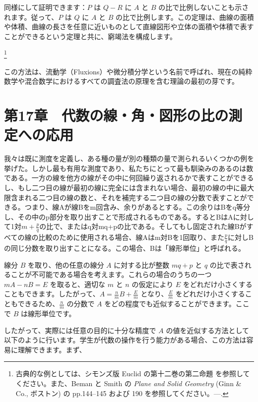\documentclass[a4paper,11pt,openany]{ltjsbook}
\newcommand{\PgSep}[1]{}
\newcommand{\Ed}{\text{Ed}}
\newcommand{\Title}[1]{\textit{#1}}
\begin{document}
同様にして証明できます：\( P \) は \( Q - R \) に \( A \) と \( B \) の比で比例しないことも示されます。従って、\( P \) は \( Q \) に \( A \) と \( B \) の比で比例します。この定理は、曲線の面積や体積、曲線の長さを任意に近いものとして直線図形や立体の面積や体積で表すことができるという定理と共に、窮竭法を構成します。

\footnote
  {古典的な例としては、シモンズ版 Euclid の第十二巻の第二命題  を参照してください。また、Beman と Smith の \Title{Plane and Solid Geometry}   (Ginn \& Co., ボストン) の pp.144--145 および 190 を参照してください。---\Ed.}

この方法は、流動学（Fluxions）や微分積分学という名前で呼ばれ、現在の純粋数学や混合数学におけるすべての調査法の原理を含む理論の最初の芽です。



\PgSep{266}

\chapter{第17章　代数の線・角・図形の比の測定への応用}

我々は既に測度を定義し、ある種の量が別の種類の量で測られるいくつかの例を挙げた。しかし最も有用な測度であり、私たちにとって最も馴染みのあるのは数である。一方の線を他方の線がその中に何回繰り返されるかで表すことができるし、もし二つ目の線が最初の線に完全には含まれない場合、最初の線の中に最大限含まれる二つ目の線の数と、それを補完する二つ目の線の分数で表すことができる。つまり、線Aが線Bをm回含み、余りがあるとする。この余りはBをq等分し、その中のp部分を取り出すことで形成されるものである。するとBはAに対して1対\( m + \frac{p}{q} \)の比で、またはq対mq+pの比である。そしてもし固定された線Bがすべての線の比較のために使用される場合、線Aはm対Bを1回取り、また\(\frac{p}{q}\)に対しBの同じ分数を取り出すことになる。この場合、Bは「線形単位」と呼ばれる。

線分 \( B \) を取り、他の任意の線分 \( A \) に対する比が整数 \( mq + p \) と \( q \) の比で表されることが不可能である場合を考えます。これらの場合のうちの一つ \( mA - nB = E \) を取ると、適切な \( m \) と \( n \) の仮定により \( E \) をどれだけ小さくすることもできます。したがって、\( A = \frac{n}{m} B + \frac{E}{m} \) となり、\(\frac{E}{m}\) をどれだけ小さくすることもできるため、\(\frac{n}{m}\) の分数で \( A \) をどの程度でも近似することができます。ここで \( B \) は線形単位です。

したがって、実際には任意の目的に十分な精度で \( A \) の値を近似する方法として以下のように行います。学生が代数の操作を行う能力がある場合、この方法は容易に理解できます。まず、
\end{document}
